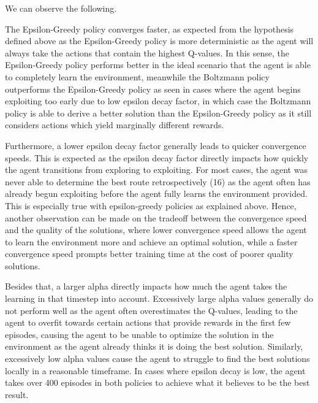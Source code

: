 We can observe the following.

The Epsilon-Greedy policy converges faster, as expected from the hypothesis defined above as the Epsilon-Greedy policy is more deterministic as the agent will always take the actions that contain the highest Q-values. In this sense, the Epsilon-Greedy policy performs better in the ideal scenario that the agent is able to completely learn the environment, meanwhile the Boltzmann policy outperforms the Epsilon-Greedy policy as seen in cases where the agent begins exploiting too early due to low epsilon decay factor, in which case the Boltzmann policy is able to derive a better solution than the Epsilon-Greedy policy as it still considers actions which yield marginally different rewards.

Furthermore, a lower epsilon decay factor generally leads to quicker convergence speeds. This is expected as the epsilon decay factor directly impacts how quickly the agent transitions from exploring to exploiting. For most cases, the agent was never able to determine the best route retrospectively (16) as the agent often has already begun exploiting before the agent fully learns the environment provided. This is especially true with epsilon-greedy policies as explained above. Hence, another observation can be made on the tradeoff between the convergence speed and the quality of the solutions, where lower convergence speed allows the agent to learn the environment more and achieve an optimal solution, while a faster convergence speed prompts better training time at the cost of poorer quality solutions.

Besides that, a larger alpha directly impacts how much the agent takes the learning in that timestep into account. Excessively large alpha values generally do not perform well as the agent often overestimates the Q-values, leading to the agent to overfit towards certain actions that provide rewards in the first few episodes, causing the agent to be unable to optimize the solution in the environment as the agent already thinks it is doing the best solution. Similarly, excessively low alpha values cause the agent to struggle to find the best solutions locally in a reasonable timeframe. In cases where epsilon decay is low, the agent takes over 400 episodes in both policies to achieve what it believes to be the best result.


